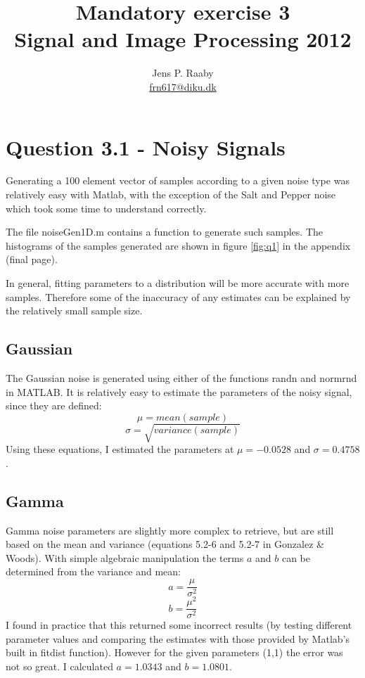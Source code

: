 \documentclass{article}
\title{Mandatory exercise 3 \\
Signal and Image Processing 2012}
\author{Jens P. Raaby \\
\url{frn617@diku.dk}}
\begin{document}
 
\maketitle

\section*{Question 3.1 - Noisy Signals}
Generating a 100 element vector of samples according to a given noise type was relatively easy with Matlab, with the exception of the Salt and Pepper noise which took some time to understand correctly. 

The file noiseGen1D.m contains a function to generate such samples. The histograms of the samples generated are shown in figure \ref{fig:q1} in the appendix (final page). 

In general, fitting parameters to a distribution will be more accurate with more samples. Therefore some of the inaccuracy of any estimates can be explained by the relatively small sample size.

\subsection*{Gaussian}
The Gaussian noise is generated using either of the functions randn and normrnd in MATLAB. It is relatively easy to estimate the parameters of the noisy signal, since they are defined:
\[
\mu = mean(sample)
\]
\[
\sigma = \sqrt{variance(sample)}
\]
Using these equations, I estimated the parameters at $\mu = -0.0528$ and $\sigma = 0.4758$.

\subsection*{Gamma}
Gamma noise parameters are slightly more complex to retrieve, but are still based on the mean and variance (equations 5.2-6 and 5.2-7 in Gonzalez \& Woods). With simple algebraic manipulation the terms $a$ and $b$ can be determined from the variance and mean:
\[
a =  \frac {\mu} {\sigma ^2}
\]
\[
b =  \frac { \mu ^2} {\sigma ^2}
\]
I found in practice that this returned some incorrect results (by testing different parameter values and comparing the estimates with those provided by Matlab's built in fitdist function). However for the given parameters (1,1) the error was not so great. I calculated $a=1.0343$ and $b=1.0801$.
\end{document}
